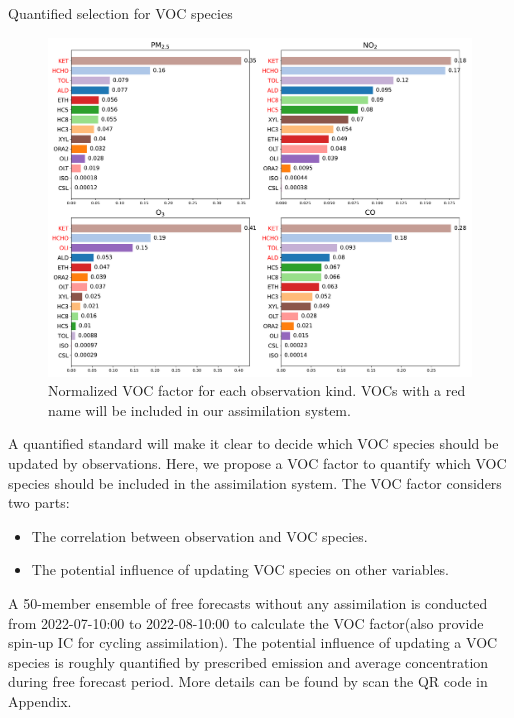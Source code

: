 \documentclass[final]{beamer}
\newlength{\colwidth}
\newlength{\sepparagraph}
\newcommand{\sepnewparagraph}{\vspace{\sepparagraph}}
\begin{document}
\begin{frame}[t]
\begin{columns}[t]
\begin{column}{\colwidth}
\begin{block}{Quantified selection for VOC species}
\begin{figure}
                    \centerline{\includegraphics[width=0.7\colwidth,angle=0]{figure/VOC_factor_domainavg.pdf}}                  

                    \caption{Normalized VOC factor for each observation kind. VOCs with a red name will be included in our assimilation system.}   
                    \label{fig_voc_factor}
                \end{figure}

                \RaggedRight
                A quantified standard will make it clear to decide which VOC species should be updated by observations. Here, we propose a VOC factor to quantify which VOC species should be included in the assimilation system. The VOC factor considers two parts:
                \sepnewparagraph
                \begin{itemize}
                    \item The correlation between observation and VOC species.
                    \item The potential influence of updating VOC species on other variables.
                \end{itemize}
                \sepnewparagraph
                A 50-member ensemble of free forecasts without any assimilation is conducted from 2022-07-10:00 to 2022-08-10:00 to calculate the VOC factor(also provide spin-up IC for cycling assimilation). The potential influence of updating a VOC species is roughly quantified by prescribed emission and average concentration during free forecast period. More details can be found by scan the QR code in Appendix.


\end{block}
\end{column}
\end{columns}
\end{frame}
\end{document}
